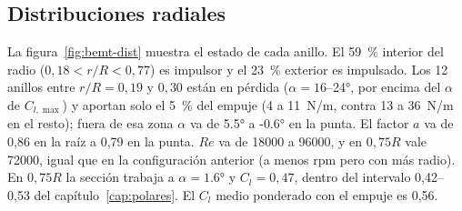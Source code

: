 \subsection{Distribuciones radiales}

La figura~\ref{fig:bemt-dist} muestra el estado de cada anillo. El \SI{59}{\percent}
interior del radio ($0{,}18<r/R<0{,}77$) es impulsor y el \SI{23}{\percent} exterior es
impulsado. Los 12 anillos entre $r/R=0{,}19$ y $0{,}30$ están en pérdida ($\alpha=16$--\ang{24}, por encima del
$\alpha$ de $C_{l,\max}$) y aportan solo el \SI{5}{\percent} del empuje (4 a \SI{11}{N/m}, contra 13 a \SI{36}{N/m} en el resto);
fuera de esa zona $\alpha$ va de \ang{5.5} a \ang{-0.6} en la punta. El factor
$a$ va de 0,86 en la raíz a 0,79 en la punta. $Re$ va de \num{18000} a \num{96000}, y en
$0{,}75R$ vale \num{72000}, igual que en la configuración anterior (a menos rpm pero con
más radio). En $0{,}75R$ la sección trabaja a $\alpha=\ang{1.6}$ y $C_l=0{,}47$, dentro del
intervalo 0,42--0,53 del capítulo~\ref{cap:polares}. El $C_l$ medio ponderado con el
empuje es 0,56.

